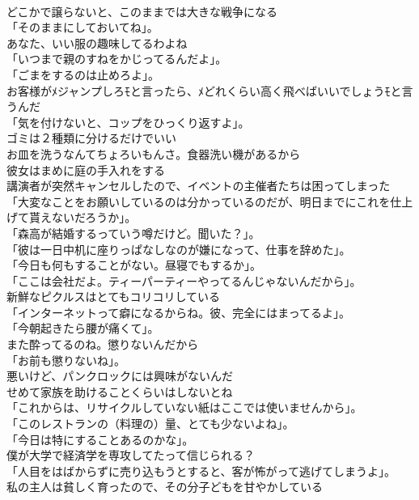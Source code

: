 \documentclass[8pt]{extreport}
\begin{document}
\begin{CJK}{UTF8}{min}
\\	どこかで譲らないと、このままでは大きな戦争になる	
\\	「そのままにしておいてね」。	
\\	あなた、いい服の趣味してるわよね	
\\	「いつまで親のすねをかじってるんだよ」。	
\\	「ごまをするのは止めろよ」。	
\\	お客様がﾒジャンプしろﾓと言ったら、ﾒどれくらい高く飛べばいいでしょうﾓと言うんだ	
\\	「気を付けないと、コップをひっくり返すよ」。	
\\	ゴミは２種類に分けるだけでいい	
\\	お皿を洗うなんてちょろいもんさ。食器洗い機があるから	
\\	彼女はまめに庭の手入れをする	
\\	講演者が突然キャンセルしたので、イベントの主催者たちは困ってしまった	
\\	「大変なことをお願いしているのは分かっているのだが、明日までにこれを仕上げて貰えないだろうか」。	
\\	「森高が結婚するっていう噂だけど。聞いた？」。	
\\	「彼は一日中机に座りっぱなしなのが嫌になって、仕事を辞めた」。	
\\	「今日も何もすることがない。昼寝でもするか」。	
\\	「ここは会社だよ。ティーパーティーやってるんじゃないんだから」。	
\\	新鮮なピクルスはとてもコリコリしている	
\\	「インターネットって癖になるからね。彼、完全にはまってるよ」。	
\\	「今朝起きたら腰が痛くて」。	
\\	また酔ってるのね。懲りないんだから	
\\	「お前も懲りないね」。	
\\	悪いけど、パンクロックには興味がないんだ	
\\	せめて家族を助けることくらいはしないとね	
\\	「これからは、リサイクルしていない紙はここでは使いませんから」。	
\\	「このレストランの（料理の）量、とても少ないよね」。	
\\	「今日は特にすることあるのかな」。	
\\	僕が大学で経済学を専攻してたって信じられる？	
\\	「人目をはばからずに売り込もうとすると、客が怖がって逃げてしまうよ」。	
\\	私の主人は貧しく育ったので、その分子どもを甘やかしている	

\end{CJK}
\end{document}
